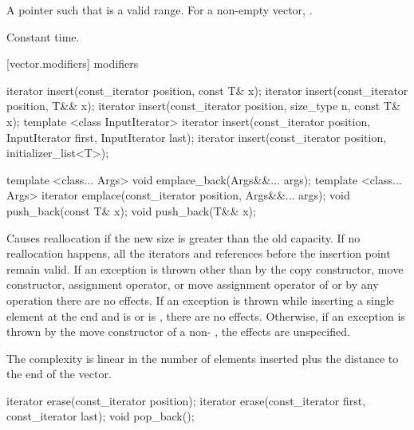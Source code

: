 \begin{itemdescr}
\pnum
\returns
A pointer such that  is a valid range. For a
non-empty vector,  \tcode{==} .

\pnum
\complexity
Constant time.
\end{itemdescr}

[vector.modifiers]{ modifiers}

%
\begin{itemdecl}
iterator insert(const_iterator position, const T& x);
iterator insert(const_iterator position, T&& x);
iterator insert(const_iterator position, size_type n, const T& x);
template <class InputIterator>
  iterator insert(const_iterator position, InputIterator first, InputIterator last);
iterator insert(const_iterator position, initializer_list<T>);

template <class... Args> void emplace_back(Args&&... args);
template <class... Args> iterator emplace(const_iterator position, Args&&... args);
void push_back(const T& x);
void push_back(T&& x);
\end{itemdecl}

\begin{itemdescr}
\pnum
\remarks
Causes reallocation if the new size is greater than the old capacity.
If no reallocation happens, all the iterators and references before the insertion point remain valid.
If an exception is thrown other than by
the copy constructor, move constructor,
assignment operator, or move assignment operator of
 or by any  operation
there are no effects.
If an exception is thrown while inserting a single element at the end and
 is  or 
is , there are no effects.
Otherwise, if an exception is thrown by the move constructor of a non-
, the effects are unspecified.

\pnum
\complexity
The complexity is linear in the number of elements inserted plus the distance
to the end of the vector.
\end{itemdescr}

%
\begin{itemdecl}
iterator erase(const_iterator position);
iterator erase(const_iterator first, const_iterator last);
void pop_back();
\end{itemdecl}

